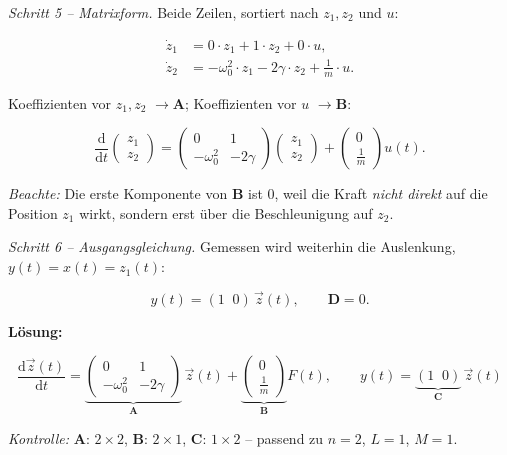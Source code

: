 \begin{beispiel}
\medskip
\textit{Schritt 5 – Matrixform.}
Beide Zeilen, sortiert nach $z_1, z_2$ und $u$:

$$
\begin{aligned}
\dot{z}_1 &= 0\cdot z_1 + 1\cdot z_2 + 0\cdot u, \\
\dot{z}_2 &= -\omega_0^2\cdot z_1 - 2\gamma\cdot z_2 + \tfrac{1}{m}\cdot u.
\end{aligned}
$$

Koeffizienten vor $z_1, z_2$ $\to \mathbf{A}$; Koeffizienten vor $u$ $\to
\mathbf{B}$:

$$
\frac{\mathrm{d}}{\mathrm{d}t}
\begin{pmatrix} z_1 \\ z_2 \end{pmatrix}
=
\begin{pmatrix} 0 & 1 \\ -\omega_0^2 & -2\gamma \end{pmatrix}
\begin{pmatrix} z_1 \\ z_2 \end{pmatrix}
+
\begin{pmatrix} 0 \\ \tfrac{1}{m} \end{pmatrix}
u(t).
$$

\emph{Beachte:} Die erste Komponente von $\mathbf{B}$ ist $0$, weil die Kraft
\emph{nicht direkt} auf die Position $z_1$ wirkt, sondern erst über die
Beschleunigung auf $z_2$.

\medskip
\textit{Schritt 6 – Ausgangsgleichung.}
Gemessen wird weiterhin die Auslenkung, $y(t) = x(t) = z_1(t)$:

$$
y(t) = (1\;\; 0)\,\vec{z}(t), \qquad \mathbf{D} = 0.
$$

\textbf{Lösung:}

$$
\boxed{
\frac{\mathrm{d}\vec{z}(t)}{\mathrm{d}t}
= \underbrace{\begin{pmatrix} 0 & 1 \\ -\omega_0^2 & -2\gamma \end{pmatrix}}_{\mathbf{A}}
\,\vec{z}(t)
+ \underbrace{\begin{pmatrix} 0 \\ \tfrac{1}{m} \end{pmatrix}}_{\mathbf{B}}
F(t),
\qquad
y(t) = \underbrace{(1\;\; 0)}_{\mathbf{C}}\,\vec{z}(t)
}
$$

\textit{Kontrolle:} $\mathbf{A}\!:\,2\times2$, $\mathbf{B}\!:\,2\times1$,
$\mathbf{C}\!:\,1\times2$ -- passend zu $n=2$, $L=1$, $M=1$. \checkmark


\end{beispiel}

